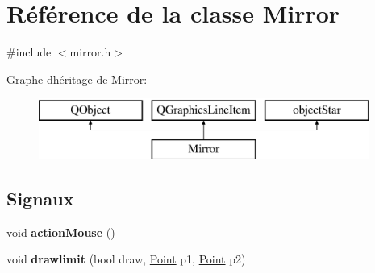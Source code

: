 \hypertarget{class_mirror}{}\section{Référence de la classe Mirror}
\label{class_mirror}


{\ttfamily \#include $<$mirror.\+h$>$}

Graphe d\textquotesingle{}héritage de Mirror\+:\begin{figure}[H]
\begin{center}
\leavevmode
\includegraphics[height=2.000000cm]{class_mirror}
\end{center}
\end{figure}
\subsection*{Signaux}
\begin{DoxyCompactItemize}
\item 
\mbox{\label{class_mirror_a5ccb7dfd527aca49395a6e9553f415ad}} 
void {\bfseries action\+Mouse} ()
\item 
\mbox{\label{class_mirror_aecde4f1876340988a5849f5d65e0d0ba}} 
void {\bfseries drawlimit} (bool draw, \mbox{\hyperlink{class_point}{Point}} p1, \mbox{\hyperlink{class_point}{Point}} p2)
\end{DoxyCompactItemize}
